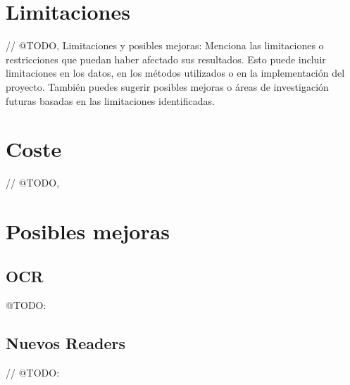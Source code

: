 \section{Limitaciones}

// @TODO, Limitaciones y posibles mejoras: Menciona las limitaciones o restricciones
que puedan haber afectado sus resultados.
Esto puede incluir limitaciones en los datos, en los métodos utilizados o en la implementación del proyecto.
También puedes sugerir posibles mejoras o áreas de investigación futuras basadas en las limitaciones identificadas.


\section{Coste}
// @TODO,


\section{Posibles mejoras}

\subsection*{OCR}
\colorbox{color_highlight}{@TODO:}

\subsection*{Nuevos Readers}
// @TODO:
